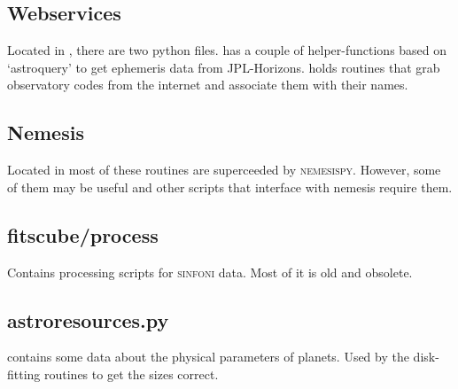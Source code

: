 \subsection{Webservices}

Located in , there are two python files.  has a couple of helper-functions based on `astroquery' to get ephemeris data from JPL-Horizons.  holds routines that grab observatory codes from the internet and associate them with their names.


\subsection{Nemesis}

Located in  most of these routines are superceeded by \textsc{nemesispy}. However, some of them may be useful and other scripts that interface with nemesis require them.


\subsection{fitscube/process}

Contains processing scripts for \textsc{sinfoni} data. Most of it is old and obsolete.

\subsection{astro{\textunderscore}resources.py}

 contains some data about the physical parameters of planets. Used by the disk-fitting routines to get the sizes correct.